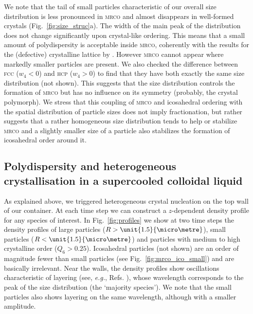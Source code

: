\documentclass[8.5pt,twoside,twocolumn]{article}
\begin{document}
We note that the tail of small particles characteristic of our overall size distribution is less pronounced in \textsc{mrco} and almost disappears in well-formed crystals (Fig.~\ref{fig:size_struc}a). The width of the main peak of the distribution does not change significantly upon crystal-like ordering. This means that a small amount of polydispersity is acceptable inside \textsc{mrco}, coherently with the results for the (defective) crystalline lattice by \citet{Fasolo2003}. However \textsc{mrco} cannot appear where markedly smaller particles are present. We also checked the difference between \textsc{fcc} ($w_4<0$) and \textsc{hcp} ($w_4>0$) to find that they have both exactly the same size distribution (not shown). This suggests that the size distribution controls the formation of \textsc{mrco} but has no influence on its symmetry (probably, the crystal 
polymorph). 
We stress that this coupling of \textsc{mrco} and icosahedral ordering with the spatial distribution of particle sizes does not imply fractionation, but rather suggests
that a rather homogeneous size distribution tends to help or stabilize \textsc{mrco} and a slightly smaller size of a particle also stabilizes the formation of icosahedral order 
around it.   

\subsection{Polydispersity and heterogeneous crystallisation in a supercooled colloidal liquid}


As explained above, we triggered heterogeneous crystal nucleation on the top wall of our container. At each time step we can construct a $z$-dependent density profile for any species of interest. In Fig.~\ref{fig:profiles} we show at two time steps the density profiles of large particles ($R>\unit{1.5}{\micro\metre}$), small particles ($R<\unit{1.5}{\micro\metre}$) and particles with medium to high crystalline order ($Q_6>0.25$). Icosahedral particles (not shown) are an order of magnitude fewer than small particles (see Fig.~\ref{fig:mrco_ico_small}) and are basically irrelevant. Near the walls, the density profiles show oscillations characteristic of layering 
(see, \emph{e.g.}, Refs. \cite{watanabe2011,kob3}), whose wavelength corresponds to the peak of the size distribution (the `majority species'). We note that the small particles also shows layering on the same wavelength, although with a smaller amplitude.
\end{document}
